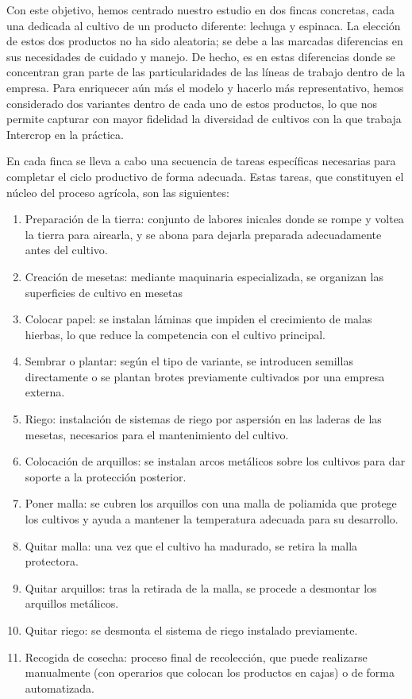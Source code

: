 














\newpage
Con este objetivo, hemos centrado nuestro estudio en dos fincas concretas, cada una dedicada al cultivo de un producto diferente: lechuga y espinaca.
La elección de estos dos productos no ha sido aleatoria; se debe a las marcadas diferencias en sus necesidades de cuidado y manejo.
De hecho, es en estas diferencias donde se concentran gran parte de las particularidades de las líneas de trabajo dentro de la empresa.
Para enriquecer aún más el modelo y hacerlo más representativo, hemos considerado dos variantes dentro de cada uno de estos productos, lo que nos permite capturar con mayor fidelidad la diversidad de cultivos con la que trabaja Intercrop en la práctica.

En cada finca se lleva a cabo una secuencia de tareas específicas necesarias para completar el ciclo productivo de forma adecuada. Estas tareas, que constituyen el núcleo del proceso agrícola, son las siguientes:
\begin{enumerate}
    \item Preparación de la tierra: conjunto de labores inicales donde se rompe y voltea la tierra para airearla, y se abona para dejarla preparada adecuadamente antes del cultivo.
    \item Creación de mesetas: mediante maquinaria especializada, se organizan las superficies de cultivo en mesetas 
    \item Colocar papel: se instalan láminas que impiden el crecimiento de malas hierbas, lo que reduce la competencia con el cultivo principal.
    \item Sembrar o plantar: según el tipo de variante, se introducen semillas directamente o se plantan brotes previamente cultivados por una empresa externa.
    \item Riego: instalación de sistemas de riego por aspersión en las laderas de las mesetas, necesarios para el mantenimiento del cultivo.
    \item Colocación de arquillos: se instalan arcos metálicos sobre los cultivos para dar soporte a la protección posterior.
    \item Poner malla: se cubren los arquillos con una malla de poliamida que protege los cultivos y ayuda a mantener la temperatura adecuada para su desarrollo.
    \item Quitar malla: una vez que el cultivo ha madurado, se retira la malla protectora.
    \item Quitar arquillos: tras la retirada de la malla, se procede a desmontar los arquillos metálicos.
    \item Quitar riego: se desmonta el sistema de riego instalado previamente.
    \item Recogida de cosecha: proceso final de recolección, que puede realizarse manualmente (con operarios que colocan los productos en cajas) o de forma automatizada.
\end{enumerate}

